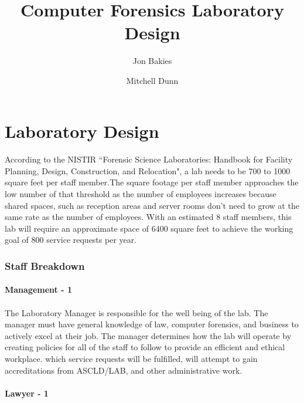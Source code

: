 \documentclass{article}
\begin{document}
\title{Computer Forensics Laboratory Design}
\author{Jon Bakies \and Mitchell Dunn} 

\maketitle
\newpage

\tableofcontents
\newpage


\section{Laboratory Design}

\paragraph{} According to the NISTIR ``Forensic Science Laboratories: Handbook for Facility Planning, Design, Construction, and Relocation", a lab needs to be 700 to 1000 square feet per staff member.The square footage per staff member approaches the low number of that threshold as the number of employees increases because shared spaces, such as reception areas and server rooms don't need to grow at the same rate as the number of employees.  With an estimated 8 staff members, this lab will require an approximate space of 6400 square feet to achieve the working goal of 800 service requests per year.
\subsubsection{Staff Breakdown}
\paragraph {Management - 1} 
\paragraph{} The Laboratory Manager is responsible for the well being of the lab.  The manager must have general knowledge of law, computer forensics, and business to actively excel at their job.  The manager determines how the lab will operate by creating policies for all of the staff to follow to provide an efficient and ethical workplace.  which service requests will be fulfilled, will attempt to gain accreditations from ASCLD/LAB, and other administrative work.  
 
\paragraph{Lawyer - 1} 
\end{document}
